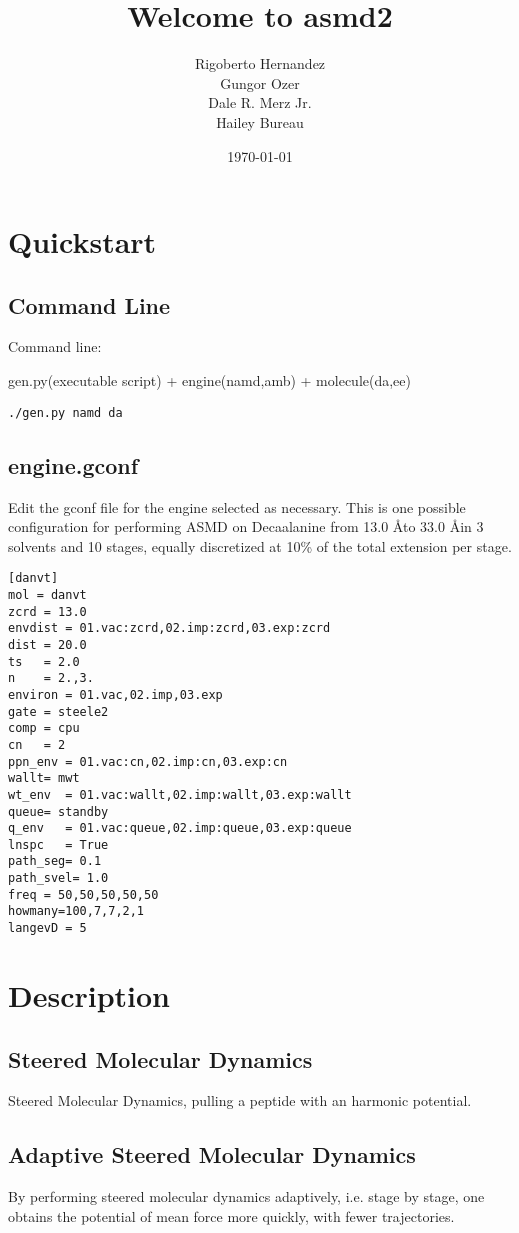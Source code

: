 \documentclass[11pt]{article}
\title{\textbf{Welcome to asmd2}}
\author{Rigoberto Hernandez\\
		Gungor Ozer\\
		Dale R. Merz Jr. \\
		Hailey Bureau}
\date{\today}
\begin{document}
\maketitle

\section{Quickstart}

\subsection{Command Line}
Command line: 

gen.py(executable script) + engine(namd,amb) + molecule(da,ee)

\begin{verbatim}
./gen.py namd da
\end{verbatim}

\subsection{engine.gconf}

Edit the gconf file for the engine selected as necessary. This is one possible configuration for performing ASMD on Decaalanine from 13.0 \AA to 33.0 \AA in 3 solvents and 10 stages, equally discretized at 10\% of the total extension per stage.
\begin{verbatim}
[danvt]
mol = danvt
zcrd = 13.0
envdist = 01.vac:zcrd,02.imp:zcrd,03.exp:zcrd
dist = 20.0
ts   = 2.0
n    = 2.,3.
environ = 01.vac,02.imp,03.exp
gate = steele2
comp = cpu
cn   = 2
ppn_env = 01.vac:cn,02.imp:cn,03.exp:cn
wallt= mwt
wt_env  = 01.vac:wallt,02.imp:wallt,03.exp:wallt
queue= standby
q_env   = 01.vac:queue,02.imp:queue,03.exp:queue
lnspc   = True
path_seg= 0.1
path_svel= 1.0
freq = 50,50,50,50,50
howmany=100,7,7,2,1
langevD = 5
\end{verbatim}



\section{Description}
\subsection{Steered Molecular Dynamics}
Steered Molecular Dynamics, pulling a peptide with an harmonic potential.
\subsection{Adaptive Steered Molecular Dynamics}
By performing steered molecular dynamics adaptively, i.e. stage by stage, one obtains the potential of mean force more quickly, with fewer trajectories.
\end{document}
